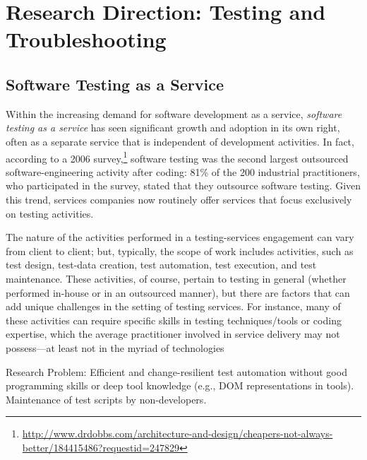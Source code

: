 
\section{Research Direction: Testing and Troubleshooting}
\label{sec:testing-debugging}

\subsection{Software Testing as a Service}

Within the increasing demand for software development as a service,
\textit{software testing as a service} has seen significant growth and adoption
in its own right, often as a separate service that is independent of development
activities. In fact, according to a 2006 survey,\footnote{\scriptsize
  \url{http://www.drdobbs.com/architecture-and-design/cheapers-not-always-better/184415486?requestid=247829}}
software testing was the second largest outsourced software-engineering activity
after coding: 81\% of the 200 industrial practitioners, who participated in the
survey, stated that they outsource software testing. Given this trend, services
companies now routinely offer services that focus exclusively on testing
activities.


The nature of the activities performed in a testing-services engagement can vary
from client to client; but, typically, the scope of work includes activities,
such as test design, test-data creation, test automation, test execution, and
test maintenance. These activities, of course, pertain to testing in general
(whether performed in-house or in an outsourced manner), but there are factors
that can add unique challenges in the setting of testing services. For instance,
many of these activities can require specific skills in testing techniques/tools
or coding expertise, which the average practitioner involved in service delivery
may not possess---at least not in the myriad of technologies 


Research Problem: Efficient and change-resilient test automation without good
programming skills or deep tool knowledge (e.g., DOM representations in
tools). Maintenance of test scripts by non-developers.

